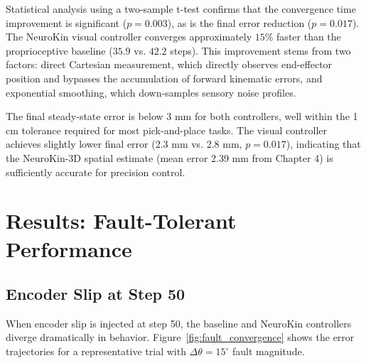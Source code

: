 \documentclass[12pt,a4paper,oneside]{report}
\begin{document}
\begin{table}[H]
\centering
\caption{Nominal performance comparison (no faults, mean $\pm$ std over 100 trials).}
\label{tab:nominal_performance}
\end{table}

Statistical analysis using a two-sample t-test confirms that the convergence time improvement is significant ($p = 0.003$), as is the final error reduction ($p = 0.017$). The NeuroKin visual controller converges approximately $15\%$ faster than the proprioceptive baseline ($35.9$ vs. $42.2$ steps). This improvement stems from two factors: direct Cartesian measurement, which directly observes end-effector position and bypasses the accumulation of forward kinematic errors, and exponential smoothing, which down-samples sensory noise profiles.

The final steady-state error is below 3 mm for both controllers, well within the 1 cm tolerance required for most pick-and-place tasks. The visual controller achieves slightly lower final error (2.3 mm vs. 2.8 mm, $p = 0.017$), indicating that the NeuroKin-3D spatial estimate (mean error 2.39 mm from Chapter 4) is sufficiently accurate for precision control.

\section{Results: Fault-Tolerant Performance}

\subsection{Encoder Slip at Step 50}

When encoder slip is injected at step 50, the baseline and NeuroKin controllers diverge dramatically in behavior. Figure~\ref{fig:fault_convergence} shows the error trajectories for a representative trial with $\Delta \theta = 15^\circ$ fault magnitude.
\end{document}
